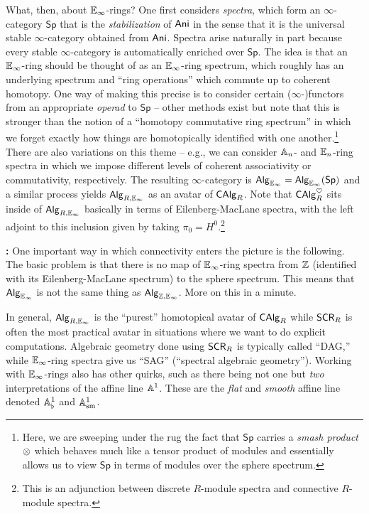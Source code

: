 \documentclass[11pt]{article}
\renewcommand{\Sp}{\mathsf{Sp}} %
\begin{document}
What, then, about $\mathbb{E}_{\infty}$-rings? One first considers \emph{spectra}, which form an $\infty$-category $\Sp$ that is the \emph{stabilization} of $\operatorname{\mathsf{Ani}}$ in the sense that it is the universal stable $\infty$-category obtained from $\operatorname{\mathsf{Ani}}$. Spectra arise naturally in part because every stable $\infty$-category is automatically enriched over $\Sp$. The idea is that an $\mathbb{E}_{\infty}$-ring should be thought of as an $\mathbb{E}_{\infty}$-ring spectrum, which roughly has an underlying spectrum and ``ring operations'' which commute up to coherent homotopy. One way of making this precise is to consider certain ($\infty$-)functors from an appropriate \emph{operad} to $\Sp$ -- other methods exist but note that this is stronger than the notion of a ``homotopy commutative ring spectrum'' in which we forget exactly how things are homotopically identified with one another.\footnote{Here, we are sweeping under the rug the fact that $\Sp$ carries a \emph{smash product} $\otimes$ which behaves much like a tensor product of modules and essentially allows us to view $\Sp$ in terms of modules over the sphere spectrum.} There are also variations on this theme -- e.g., we can consider $\mathbb{A}_n$- and $\mathbb{E}_n$-ring spectra in which we impose different levels of coherent associativity or commutativity, respectively. The resulting $\infty$-category is $\Alg_{\E_{\infty}}=\Alg_{\E_{\infty}}(\Sp)$ and a similar process yields $\operatorname{\mathsf{Alg}}_{R,\mathbb{E}_{\infty}}$ as an avatar of $\operatorname{\mathsf{CAlg}}_R$. Note that $\operatorname{\mathsf{CAlg}}_R^{\heartsuit}$ sits inside of $\operatorname{\mathsf{Alg}}_{R,\mathbb{E}_{\infty}}$ basically in terms of Eilenberg-MacLane spectra, with the left adjoint to this inclusion given by taking $\pi_0=H^0$.\footnote{This is an adjunction between discrete $R$-module spectra and connective $R$-module spectra.}

\textbf{:} One important way in which connectivity enters the picture is the following. The basic problem is that there is no map of $\mathbb{E}_{\infty}$-ring spectra from $\mathbb{Z}$ (identified with its Eilenberg-MacLane spectrum) to the sphere spectrum. This means that $\operatorname{\mathsf{Alg}}_{\mathbb{E}_{\infty}}$ is not the same thing as $\operatorname{\mathsf{Alg}}_{\mathbb{Z},\mathbb{E}_{\infty}}$. More on this in a minute.

In general, $\operatorname{\mathsf{Alg}}_{R,\mathbb{E}_{\infty}}$ is the ``purest'' homotopical avatar of $\operatorname{\mathsf{CAlg}}_R$ while $\operatorname{\mathsf{SCR}}_R$ is often the most practical avatar in situations where we want to do explicit computations. Algebraic geometry done using $\operatorname{\mathsf{SCR}}_R$ is typically called ``DAG,'' while $\mathbb{E}_{\infty}$-ring spectra give us ``SAG'' (``spectral algebraic geometry''). Working with $\mathbb{E}_{\infty}$-rings also has other quirks, such as there being not one but \emph{two} interpretations of the affine line $\mathbb{A}^1$. These are the \emph{flat} and \emph{smooth} affine line denoted $\mathbb{A}_{\flat}^1$ and $\mathbb{A}_{\operatorname{sm}}^1$.
\end{document}
